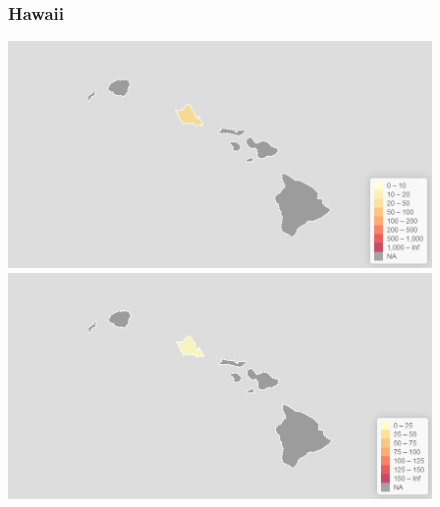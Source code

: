 \documentclass[11pt]{article}
\begin{document}
\begin{landscape}
\begin{figure}[h]
\subsubsection*{Hawaii}
\vfill
\hspace*{-3cm}
\begin{minipage}{.8\textwidth}
    \includegraphics[width=.95\textwidth]{ImageResults/HawaiiTotal.PNG}
\end{minipage}%
\begin{minipage}{.8\textwidth}
    \includegraphics[width=.95\textwidth]{ImageResults/Hawaii100k.PNG}
\end{minipage}
\fillandplacepagenumber
\end{figure}
\end{landscape}
\end{document}
